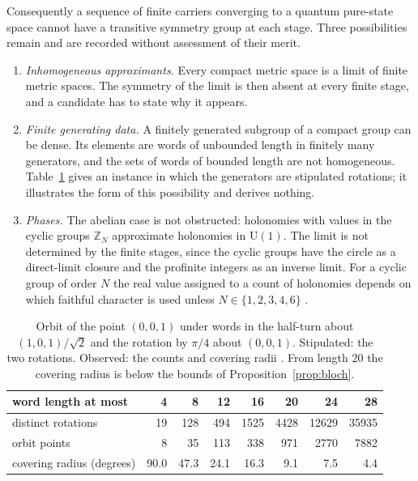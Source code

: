 Consequently a sequence of finite carriers converging to a quantum pure-state space cannot have a transitive symmetry group at each stage. Three possibilities remain and are recorded without assessment of their merit.
\begin{enumerate}[label=(\arabic*)]
\item \emph{Inhomogeneous approximants.} Every compact metric space is a limit of finite metric spaces. The symmetry of the limit is then absent at every finite stage, and a candidate has to state why it appears.
\item \emph{Finite generating data.} A finitely generated subgroup of a compact group can be dense. Its elements are words of unbounded length in finitely many generators, and the sets of words of bounded length are not homogeneous. Table~\ref{tab:words} gives an instance in which the generators are stipulated rotations; it illustrates the form of this possibility and derives nothing.
\item \emph{Phases.} The abelian case is not obstructed: holonomies with values in the cyclic groups $\mathbb{Z}_N$ approximate holonomies in $\mathrm{U}(1)$. The limit is not determined by the finite stages, since the cyclic groups have the circle as a direct-limit closure and the profinite integers as an inverse limit. For a cyclic group of order $N$ the real value assigned to a count of holonomies depends on which faithful character is used unless $N\in\{1,2,3,4,6\}$ \cite{g8}.
\end{enumerate}

\begin{table}[ht]\centering\small
\begin{tabular}{@{}lrrrrrrr@{}}\toprule
word length at most & 4 & 8 & 12 & 16 & 20 & 24 & 28\\\midrule
distinct rotations & 19 & 128 & 494 & 1525 & 4428 & 12629 & 35935\\
orbit points & 8 & 35 & 113 & 338 & 971 & 2770 & 7882\\
covering radius (degrees) & 90.0 & 47.3 & 24.1 & 16.3 & 9.1 & 7.5 & 4.4\\\bottomrule
\end{tabular}
\caption{Orbit of the point $(0,0,1)$ under words in the half-turn about $(1,0,1)/\sqrt2$ and the rotation by $\pi/4$ about $(0,0,1)$. Stipulated: the two rotations. Observed: the counts and covering radii \cite{comp}. From length $20$ the covering radius is below the bounds of Proposition~\ref{prop:bloch}.}\label{tab:words}
\end{table}

